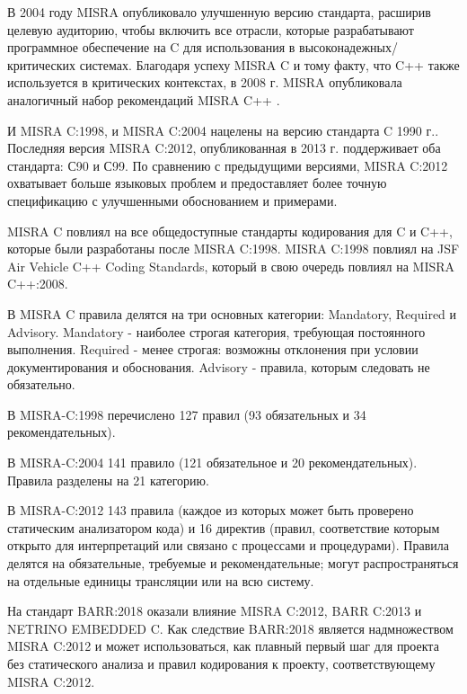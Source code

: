 В 2004 году MISRA опубликовало улучшенную версию стандарта\autocite{Misrac2004}, расширив целевую аудиторию, 
чтобы включить все отрасли, которые разрабатывают программное обеспечение на C для использования в 
высоконадежных/критических системах. Благодаря успеху MISRA C и тому факту, что C++ также используется в 
критических контекстах, в 2008 г. MISRA опубликовала аналогичный набор рекомендаций MISRA C++
\autocite{Misrac2008}.

И MISRA C:1998, и MISRA C:2004 нацелены на версию стандарта C 1990 г.\autocite{ISOIEC99899in1990}. Последняя 
версия MISRA C:2012, опубликованная в 2013 г.\autocite{Misrac2012} поддерживает оба стандарта: С90 и 
С99\autocite{ISOIEC99899in1999}. По сравнению с предыдущими версиями, MISRA C:2012 охватывает больше языковых 
проблем и предоставляет более точную спецификацию с улучшенными обоснованием и примерами.

MISRA C повлиял на все общедоступные стандарты кодирования для C и C++, которые были разработаны после MISRA 
C:1998. MISRA C:1998 повлиял на JSF Air Vehicle C++ Coding Standards\autocite{JSF}, который в свою очередь повлиял на MISRA C++:2008.

В MISRA C правила делятся на три основных категории: Mandatory, Required и Advisory. Mandatory -
наиболее строгая категория, требующая постоянного выполнения. Required - менее строгая: возможны 
отклонения при условии документирования и обоснования. Advisory - правила, которым следовать 
не обязательно.

В MISRA-C:1998 перечислено 127 правил (93 обязательных и 34 рекомендательных).

В MISRA-C:2004 141 правило (121 обязательное и 20 рекомендательных). Правила разделены на 21 категорию.

В MISRA-C:2012 143 правила (каждое из которых может быть проверено статическим анализатором кода) и 16 директив 
(правил, соответствие которым открыто для интерпретаций или связано с процессами и процедурами). Правила делятся 
на обязательные, требуемые и рекомендательные; могут распространяться на отдельные единицы трансляции или на всю 
систему.

На стандарт BARR:2018 оказали влияние MISRA C:2012, BARR C:2013 и NETRINO EMBEDDED C. Как следствие BARR:2018 является 
надмножеством MISRA C:2012 и может использоваться, как плавный первый шаг для проекта без статического анализа и правил кодирования 
к проекту, соответствующему MISRA C:2012.

